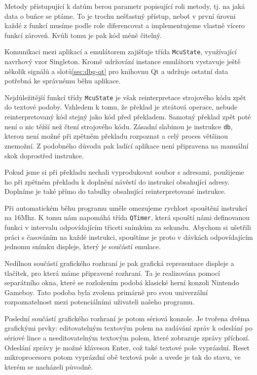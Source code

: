 Metody přistupující k datům berou parametr popisující roli metody, tj. na jaká data o buňce se ptáme. To je trochu nešťastný přístup, neboť v první úrovni každé z funkcí musíme podle role diferencovat a implementujeme vlastně vícero funkcí zároveň. Kvůli tomu je pak kód méně čitelný.


Komunikaci mezi aplikací a emulátorem zajišťuje třída \texttt{McuState}, využívající navrhový vzor Singleton\cite{gof}. Kromě udržování instance emulátoru vystavuje ještě několik signálů a slotů\ref{sec:dbg-qt} pro knihovnu Qt a udržuje ostatní data potřebná ke správnému běhu aplikace.

Nejdůležitější funkcí třídy \texttt{McuState} je však reinterpretace strojového kódu zpět do textové podoby. Vzhledem k tomu, že překlad je ztrátová operace, nebude reinterpretovaný kód stejný jako kód před překladem. Samotný překlad zpět poté není o nic těžší než čtení strojového kódu. Zásadní slabinou je instrukce \texttt{db}, kterou není možné při zpětném překladu rozpoznat a celý proces většinou znemožní. Z podobného důvodu pak ladící aplikace není připravena na manuální skok doprostřed instrukce.

Pokud jsme si při překladu nechali vyprodukovat soubor s adresami, použijeme ho při zpětném překladu k doplnění návěstí do instrukcí obsahující adresy. Doplníme je také přímo do tabulky obsahující reinterpretované instrukce.

Při automatickém běhu programu uměle omezujeme rychlost spouštění instrukcí na 16Mhz. K tomu nám napomáhá třída \texttt{QTimer}, která spouští námi definovanou funkci v intervalu odpovídajícím třiceti snímkům za sekundu. Abychom si ušetřili práci s časováním na každé instrukci, spouštíme je proto v dávkách odpovídajícím jednomu snímku displeje, který je součástí emulace.

Nedílnou součástí grafického rozhraní je pak grafická reprezentace displeje a tlačítek, pro která máme připravené rozhraní. Ta je realizována pomocí separátního okna, které se rozložením podobá klasické herní konzoli Nintendo Gameboy. Tato podoba byla zvolena primárně pro svou univerzální rozpoznatelnost mezi potenciálními uživateli našeho programu.


Poslední součástí grafického rozhraní je potom sériová konzole. Je tvořena dvěma grafickými prvky: editovatelným textovým polem na zadávání zpráv k odeslání po sériové lince a needitovatelným textovým polem, které zobrazuje zprávy příchozí. Odeslání zprávy je možné klávesou Enter, což také textové pole vyprázdní. Reset mikroprocesoru potom vyprázdní obě textová pole a uvede je tak do stavu, ve kterém se nacházeli původně.

